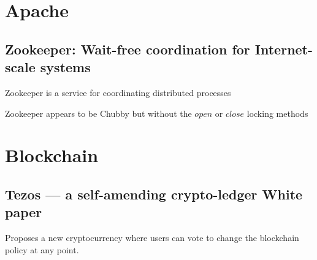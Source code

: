 \documentclass[a4paper]{article}
\begin{document}
\section{Apache}

\subsection{Zookeeper: Wait-free coordination for Internet-scale systems}

Zookeeper is a service for coordinating distributed processes

Zookeeper appears to be Chubby but without the $open$ or $close$ locking methods

\section{Blockchain}



\subsection{Tezos — a self-amending crypto-ledger White paper}

Proposes a new cryptocurrency where users can vote to change the blockchain policy at any point.
\end{document}
